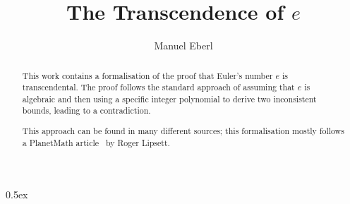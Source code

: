 \documentclass[11pt,a4paper]{article}
\begin{document}
\title{The Transcendence of $e$}
\author{Manuel Eberl}
\maketitle

\begin{abstract}
This work contains a formalisation of the proof that Euler's number $e$ is transcendental. The proof follows the standard approach of assuming that $e$ is algebraic and then using a specific integer polynomial to derive two inconsistent bounds, leading to a contradiction.

This approach can be found in many different sources; this formalisation mostly follows a PlanetMath article~\cite{planetmath} by Roger Lipsett.
\end{abstract}

\tableofcontents

\parindent 0pt\parskip 0.5ex




\begingroup
\raggedright

\endgroup
\end{document}
